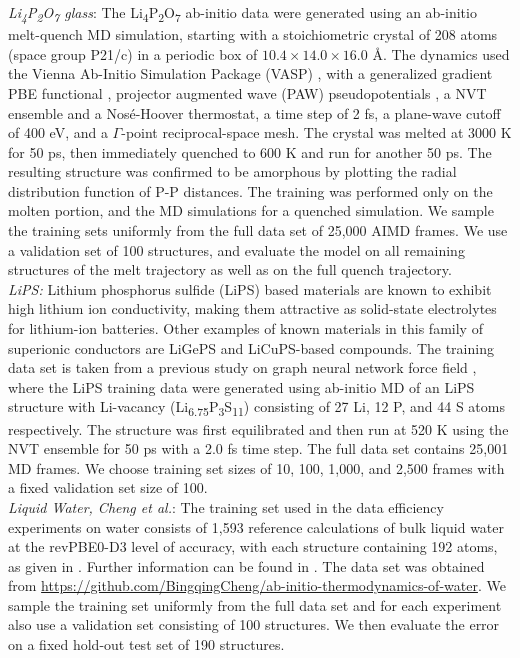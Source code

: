 \documentclass[11pt]{article}
\begin{document}
\textit{Li\textsubscript{4}P\textsubscript{2}O\textsubscript{7} glass}: The Li\textsubscript{4}P\textsubscript{2}O\textsubscript{7} ab-initio data were generated using an ab-initio melt-quench MD simulation, starting with a stoichiometric crystal of 208 atoms (space group P21/c) in a periodic box of $10.4 \times 14.0 \times 16.0$ \AA.
The dynamics used the Vienna Ab-Initio Simulation Package (VASP) \cite{vasp1,vasp2,vasp3},
with a generalized gradient PBE functional \cite{PBE}, projector augmented wave (PAW)
pseudopotentials \cite{PAW},
a NVT ensemble and a Nos\'e-Hoover thermostat,
a time step of 2 fs,
a plane-wave cutoff of 400 eV,
and a $\Gamma$-point reciprocal-space mesh.
The crystal was melted at 3000 K for 50 ps, then immediately quenched to 600 K and run for another 50 ps. The resulting structure was confirmed to be amorphous by plotting the radial distribution function of P-P distances.
The training was performed only on the molten portion, and the MD simulations for a quenched simulation. We sample the training sets uniformly from the full data set of 25,000 AIMD frames. We use a validation set of 100 structures, and evaluate the model on all remaining structures of the melt trajectory as well as on the full quench trajectory.\\

\textit{LiPS:} Lithium phosphorus sulfide (LiPS) based materials are known to exhibit high lithium ion conductivity, making them attractive as solid-state electrolytes for lithium-ion batteries. Other examples of known materials in this family of superionic conductors are LiGePS and LiCuPS-based compounds. The training data set is taken from a previous study on graph neural network force field \cite{gnnff}, where the LiPS training data were generated using ab-initio MD of an LiPS structure with Li-vacancy (Li\textsubscript{6.75}P\textsubscript{3}S\textsubscript{11}) consisting of 27 Li, 12 P, and 44 S atoms respectively. The structure was first equilibrated and then run at 520 K using the NVT ensemble for 50 ps with a 2.0 fs time step. The full data set contains 25,001 MD frames. We choose training set sizes of 10, 100, 1,000, and 2,500 frames with a fixed validation set size of 100. \\

\textit{Liquid Water, Cheng et al.}: The training set used in the data efficiency experiments on water consists of 1,593 reference calculations of bulk liquid water at the revPBE0-D3 level of accuracy, with each structure containing 192 atoms, as given in \cite{cheng2019ab}. Further information can be found in \cite{cheng2019ab}. The data set was obtained from \url{https://github.com/BingqingCheng/ab-initio-thermodynamics-of-water}. We sample the training set uniformly from the full data set and for each experiment also use a validation set consisting of 100 structures. We then evaluate the error on a fixed hold-out test set of 190 structures.\\
\end{document}
